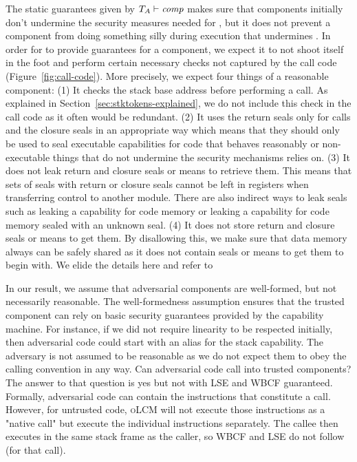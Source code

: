 \documentclass[acmsmall,review,showframe]{acmart}\settopmatter{printfolios=true,printccs=false,printacmref=false}
\renewcommand{\comp}{\var{comp}}
\newcommand{\wdjud}[2][ ]{#1 \vdash #2}
\newcommand{\srccm}{\textsc{oLCM}}
\begin{document}
The static guarantees given by $\wdjud[\ta]{\comp}$ makes sure that components initially don't undermine the security measures needed for \stktokens{}, but it does not prevent a component from doing something silly during execution that undermines \stktokens{}.
In order for \stktokens{} to provide guarantees for a component, we expect it to not shoot itself in the foot and perform certain necessary checks not captured by the call code (Figure~\ref{fig:call-code}).
More precisely, we expect four things of a reasonable component: (1) It checks the stack base address before performing a call.
As explained in Section~\ref{sec:stktokens-explained}, we do not include this check in the call code as it often would be redundant.
(2) It uses the return seals only for calls and the closure seals in an appropriate way which means that they should only be used to seal executable capabilities for code that behaves reasonably or non-executable things that do not undermine the security mechanisms \stktokens{} relies on.
(3) It does not leak return and closure seals or means to retrieve them.
This means that sets of seals with return or closure seals cannot be left in registers when transferring control to another module.
There are also indirect ways to leak seals such as leaking a capability for code memory or leaking a capability for code memory sealed with an unknown seal.
(4) It does not store return and closure seals or means to get them.
By disallowing this, we make sure that data memory always can be safely shared as it does not contain seals or means to get them to begin with.
We elide the details here and refer to~\citet{technical_report}

In our result, we assume that adversarial components are well-formed, but not necessarily reasonable. The well-formedness assumption ensures that the trusted component can rely on basic security guarantees provided by the capability machine. For instance, if we did not require linearity to be respected initially, then adversarial code could start with an alias for the stack capability. The adversary is not assumed to be reasonable as we do not expect them to obey the calling convention in any way. Can adversarial code call into trusted components? The answer to that question is yes but not with LSE and WBCF guaranteed. Formally, adversarial code can contain the instructions that constitute a call. However, for untrusted code, \srccm{} will not execute those instructions as a "native call" but execute the individual instructions separately. The callee then executes in the same stack frame as the caller, so WBCF and LSE do not follow (for that call).
\end{document}
